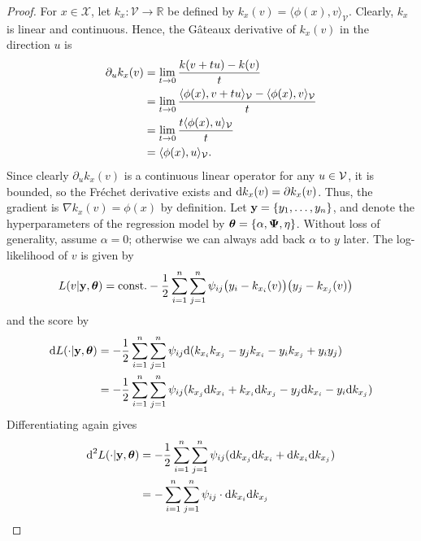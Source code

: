 \begin{proof}
	For $x \in \mathcal X$, let $k_x:\mathcal V \rightarrow \mathbb R$ be defined by $k_x(v) = \langle \phi(x), v \rangle_{\mathcal V}$. 
	Clearly, $k_x$ is linear and continuous.
	Hence, the Gâteaux derivative of $k_x(v)$ in the direction $u$ is
	\begin{align*}
		\partial_u k_x(v)	
		&= \lim_{t \rightarrow 0} \frac{k(v+t u) - k(v)}{t} \\
		&= \lim_{t \rightarrow 0} \frac{\langle \phi(x), v+t u \rangle_{{\mathcal V}} - \langle \phi(x), v \rangle_{{\mathcal V}}}{t} \\
		&= \lim_{t \rightarrow 0} \frac{t\langle \phi(x), u \rangle_{{\mathcal V}}}{t} \\
		&= \langle \phi(x), u \rangle_{{\mathcal V}}.
	\end{align*}
    Since clearly $\partial_u k_x(v)$ is a continuous linear operator for any $u\in{\mathcal V}$, it is bounded, so the Fréchet derivative exists and $\text{d} k_x(v) = \partial k_x(v)$.
	Thus, the gradient is $\nabla k_x(v) = \phi(x)$ by definition. 
	Let ${\mathbf y} = \{y_1,\dots,y_n\}$, and denote the hyperparameters of the regression model by ${\bm\theta} = \{ \alpha,{\bm\Psi},\eta \}$.
	Without loss of generality, assume $\alpha = 0$; otherwise we can always add back $\alpha$ to $y$ later.
	The log-likelihood of $v$ is given by
	\begin{align*}
		L(v|{\mathbf y},{\bm\theta}) 
		&= \text{const.} - \frac{1}{2} \sum_{i=1}^n\sum_{j=1}^n \psi_{ij}\big(y_i - k_{x_i}(v)\big)\big(y_j  - k_{x_j}(v)\big)
	\end{align*}
	and the score by
	\begin{align*}
		\text{d} L(\cdot|{\mathbf y},{\bm\theta})
		&= - \frac{1}{2} \sum_{i=1}^n\sum_{j=1}^n \psi_{ij} \text{d} (k_{x_i}k_{x_j} - y_jk_{x_i} - y_ik_{x_j} + y_iy_j )  \\
		&= - \frac{1}{2} \sum_{i=1}^n\sum_{j=1}^n \psi_{ij} (k_{x_j} \text{d} k_{x_i}  + k_{x_i}\text{d} k_{x_j} - y_j\text{d} k_{x_i} - y_i\text{d} k_{x_j} )
	\end{align*}
	Differentiating again gives
	\begin{align*}
		\d^2 L(\cdot|\by,\btheta)
		&= - \frac{1}{2} \sum_{i=1}^n\sum_{j=1}^n \psi_{ij} (\d k_{x_j} \d k_{x_i}  + \d k_{x_i}\d k_{x_j}) \\
		&= - \sum_{i=1}^n\sum_{j=1}^n \psi_{ij} \cdot \d k_{x_i} \d k_{x_j}

\end{align*}
\end{proof}
